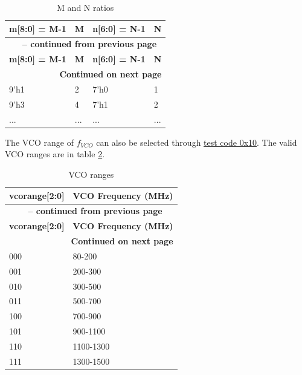 \documentclass[main\_\_EN.tex]{subfiles}
\begin{document}
\begin{longtable}{|p{3cm}|p{2cm}|p{3cm}|p{2cm}|}
    \caption{M and N ratios} \label{tab:m-n-ratios} \\
    \hline
    \rowcolor{lightgray}
    \textbf{m[8:0] = M-1} & \textbf{M} & \textbf{n[6:0] = N-1} & \textbf{N} \\ \hline
    \endfirsthead

    \multicolumn{4}{c}{\bfseries \tablename\ \thetable{} -- continued from previous page}\\\hline
    \rowcolor{lightgray}
    \textbf{m[8:0] = M-1} & \textbf{M} & \textbf{n[6:0] = N-1} & \textbf{N} \\ \hline
    \endhead

    \multicolumn{4}{r}{\textbf{Continued on next page}} \\
    \endfoot

    \endlastfoot
    
    9'h1 & 2 & 7'h0 & 1  \\ \hline
    9'h3 & 4 & 7'h1 & 2  \\ \hline
    ... & ... & ... & ...  \\ \hline
\end{longtable}

The VCO range of $f_{VCO}$ can also be selected through \hyperref[sec:test-code-0x10]{test code 0x10}. The valid VCO ranges are in table \ref{tab:vco-ranges}.

\begin{longtable}{|p{3cm}|p{5cm}|}
    \caption{VCO ranges} \label{tab:vco-ranges} \\
    \hline
    \rowcolor{lightgray}
    \textbf{vcorange[2:0]} & \textbf{VCO Frequency (MHz)} \\ \hline
    \endfirsthead

    \multicolumn{2}{c}{\bfseries \tablename\ \thetable{} -- continued from previous page}\\\hline
    \rowcolor{lightgray}
    \textbf{vcorange[2:0]} & \textbf{VCO Frequency (MHz)} \\ \hline
    \endhead

    \multicolumn{2}{r}{\textbf{Continued on next page}} \\
    \endfoot

    \endlastfoot
    
    000 & 80-200  \\ \hline
    001 & 200-300  \\ \hline
    010 & 300-500  \\ \hline
    011 & 500-700  \\ \hline
    100 & 700-900  \\ \hline
    101 & 900-1100  \\ \hline
    110 & 1100-1300  \\ \hline
    111 & 1300-1500  \\ \hline
\end{longtable}
\end{document}
